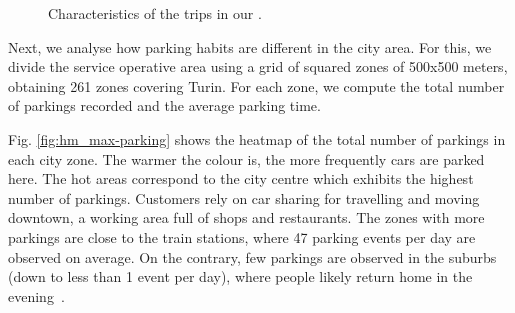 \documentclass[review, letterpaper,3p, 11pt]{elsarticle}
\providecommand{\DIFaddtex}[1]{{\protect\color{blue}\uwave{#1}}} %
\providecommand{\DIFdelbegin}{} %
\providecommand{\DIFdelend}{} %
\providecommand{\DIFaddFL}[1]{\DIFadd{#1}} %
\providecommand{\DIFdelFL}[1]{\DIFdel{#1}} %
\providecommand{\DIFaddbeginFL}{} %
\providecommand{\DIFaddendFL}{} %
\providecommand{\DIFdelbeginFL}{} %
\providecommand{\DIFdelendFL}{} %
\providecommand{\DIFadd}[1]{\texorpdfstring{\DIFaddtex{#1}}{#1}} %
\providecommand{\DIFdel}[1]{} %
\begin{document}
\begin{figure}[th]
    \centering
        \caption{Characteristics of the trips in our \DIFdelbeginFL \DIFdelFL{dataset}\DIFdelendFL \DIFaddbeginFL \DIFaddFL{data-set}\DIFaddendFL .}
        \label{}
\end{figure}


Next, we analyse how parking habits are different in the city area. For this, we divide the service operative area using a grid of squared zones of 500x500 meters, obtaining 261 zones covering Turin.
For each zone, we compute the total number of parkings recorded \DIFdelbegin \DIFdel{, the sum of all the parking duration, }\DIFdelend and the average parking time.




Fig. \ref{fig:hm_max-parking} shows the heatmap of the total number of parkings in each city zone. The warmer the colour is, the more frequently cars are parked here. The hot areas correspond to the city centre which exhibits the highest number of parkings. Customers rely on car sharing for travelling and moving downtown, a working area full of shops and restaurants. The zones with more parkings are close to the train stations, where 47 parking events per day are observed on average.
On the contrary, few parkings are observed in the suburbs (down to less than 1 event per day), where people likely return home in the evening~\cite{UMAP}. 
\end{document}
